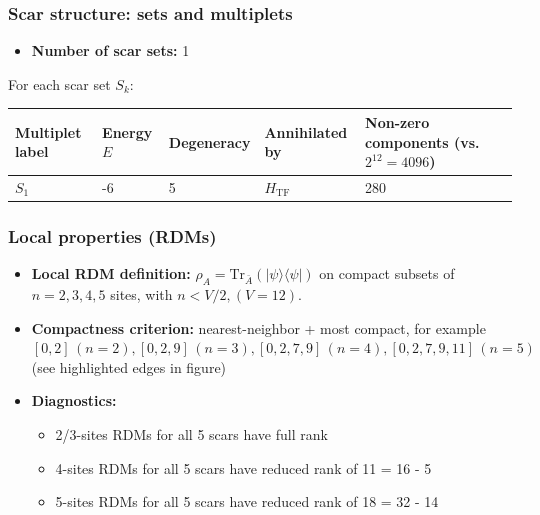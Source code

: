 \documentclass[11pt,a4paper]{article}
\newcommand{\Htf}{H_{\mathrm{TF}}}
\begin{document}
\subsubsection*{Scar structure: sets and multiplets}

\begin{itemize}[leftmargin=1.5em]
  \item \textbf{Number of scar sets:} 1
  \end{itemize}
  \hspace{6mm}For each scar set $S_k$:\\

\begin{center}
\begin{tabular}{L{3.5cm} C{2.2cm} C{2.2cm} C{2.2cm} C{3.0cm} C{3.2cm}}
\toprule
\textbf{Multiplet label} & \textbf{Energy $E$} & \textbf{Degeneracy} & \textbf{Annihilated by} & \textbf{Non-zero components (vs.\ $2^{12} = 4096$)} \\
\midrule
$S_1$ & -6 & 5 & $\Htf$ & 280 \\
\bottomrule
\end{tabular}
\end{center}

\subsubsection*{Local properties (RDMs)}

\begin{itemize}[leftmargin=1.5em]
  \item \textbf{Local RDM definition:} $\rho_A=\mathrm{Tr}_{\bar A}(|\psi\rangle\langle\psi|)$ on compact subsets of $n=2,3,4,5$ sites, with $n < V/2, (V=12)$.
  \item \textbf{Compactness criterion:} nearest-neighbor + most compact, for example $[0,2] \, (n = 2), [0,2,9] \, (n = 3), [0,2,7,9] \,  (n = 4), [0,2,7,9,11] \, (n = 5)$ (see highlighted edges in figure)
  \item \textbf{Diagnostics:} \begin{itemize} \item 2/3-sites RDMs for all 5 scars have full rank \item 4-sites RDMs for all 5 scars have reduced rank of 11 = 16 - 5 \item 5-sites RDMs for all 5 scars have reduced rank of 18 = 32 - 14 \end{itemize}
\end{itemize}

\end{document}
